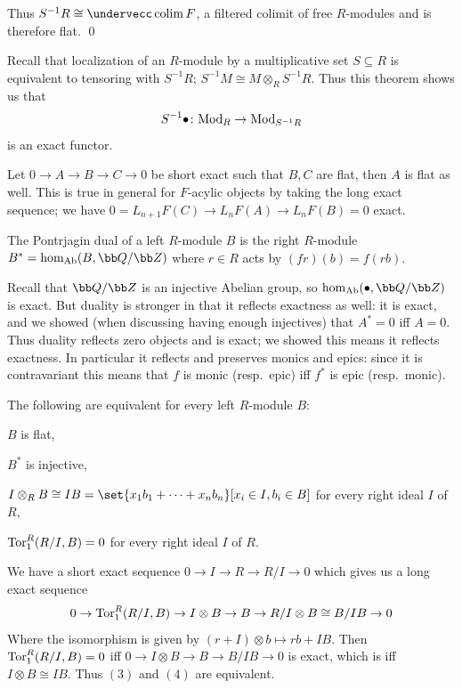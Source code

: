     Thus $S^{-1}R\cong\coflim F$, a filtered colimit of free $R$-modules and is therefore flat.
    \qed

\eproof

Recall that localization of an $R$-module by a multiplicative set $S\subseteq R$ is equivalent to tensoring with $S^{-1}R$; $S^{-1}M\cong M\otimes_RS^{-1}R$.
Thus this theorem shows us that
$$ S^{-1}\bullet\colon{\rm Mod}_R\to{\rm Mod}_{S^{-1}R} $$
is an exact functor.

\bexam

    Let $0\to A\to B\to C\to0$ be short exact such that $B,C$ are flat, then $A$ is flat as well.
    This is true in general for $F$-acylic objects by taking the long exact sequence; we have $0=L_{n+1}F(C)\to L_nF(A)\to L_nF(B)=0$ exact.

\eexam

\bdefn

    The {\emphcolor Pontrjagin dual} of a left $R$-module $B$ is the right $R$-module $B^*=\hom_\Ab(B,\bQ/\bZ)$ where $r\in R$ acts by $(fr)(b)=f(rb)$.

\edefn

Recall that $\bQ/\bZ$ is an injective Abelian group, so $\hom_\Ab(\bul,\bQ/\bZ)$ is exact.
But duality is stronger in that it reflects exactness as well: it is exact, and we showed (when discussing having enough injectives) that $A^*=0$ iff $A=0$.
Thus duality reflects zero objects and is exact; we showed this means it reflects exactness.
In particular it reflects and preserves monics and epics: since it is contravariant this means that $f$ is monic (resp.\ epic) iff $f^*$ is epic (resp.\ monic).

\bprop

    The following are equivalent for every left $R$-module $B$:
    \benum
        \item $B$ is flat,
        \item $B^*$ is injective,
        \item $I\otimes_RB\cong IB=\set{x_1b_1+\cdots+x_nb_n}[x_i\in I,b_i\in B]$ for every right ideal $I$ of $R$,
        \item ${\rm Tor}^R_1(R/I,B)=0$ for every right ideal $I$ of $R$.
    \eenum

\eprop

\bproof

    We have a short exact sequence $0\to I\to R\to R/I\to0$ which gives us a long exact sequence
    $$ 0 \to {\rm Tor}^R_1(R/I,B) \to I\otimes B \to B \to R/I\otimes B \cong B/IB \to 0 $$
    Where the isomorphism is given by $(r+I)\otimes b\mapsto rb+IB$.
    Then ${\rm Tor}^R_1(R/I,B)=0$ iff $0\to I\otimes B\to B\to B/IB\to0$ is exact, which is iff $I\otimes B\cong IB$.
    Thus $(3)$ and $(4)$ are equivalent.

